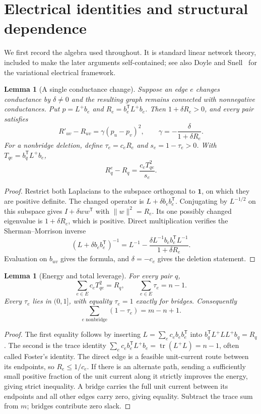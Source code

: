 \documentclass[11pt,letterpaper]{article}
\newtheorem{lemma}[theorem]{Lemma}
\newcommand{\one}{\mathbf 1}
\DeclareMathOperator{\tr}{tr}
\begin{document}
\section{Electrical identities and structural dependence}
We first record the algebra used throughout. It is standard linear network theory, included to make the later arguments self-contained; see also Doyle and Snell~\cite{DS} for the variational electrical framework.

\begin{lemma}[A single conductance change]\label{lem:update}
Suppose an edge $e$ changes conductance by $\delta\ne0$ and the resulting graph remains connected with nonnegative conductances. Put $p=L^+b_e$ and $R_e=b_e^{\mathsf T}L^+b_e$. Then $1+\delta R_e>0$, and every pair satisfies
\[
 R'_{uv}-R_{uv}=\gamma(p_u-p_v)^2,
 \qquad \gamma=-\frac{\delta}{1+\delta R_e}.
\]
For a nonbridge deletion, define $\tau_e=c_eR_e$ and $s_e=1-\tau_e>0$. With $T_{qe}=b_q^{\mathsf T}L^+b_e$,
\[
 R_q^e-R_q=\frac{c_eT_{qe}^2}{s_e}.
\]
\end{lemma}
\begin{proof}
Restrict both Laplacians to the subspace orthogonal to $\one$, on which they are positive definite. The changed operator is $L+\delta b_eb_e^{\mathsf T}$. Conjugating by $L^{-1/2}$ on this subspace gives $I+\delta ww^{\mathsf T}$ with $\|w\|^2=R_e$. Its one possibly changed eigenvalue is $1+\delta R_e$, which is positive. Direct multiplication verifies the Sherman--Morrison inverse
\[
 (L+\delta b_eb_e^{\mathsf T})^{-1}
 =L^{-1}-\frac{\delta L^{-1}b_eb_e^{\mathsf T}L^{-1}}{1+\delta R_e}.
\]
Evaluation on $b_{uv}$ gives the formula, and $\delta=-c_e$ gives the deletion statement.
\end{proof}

\begin{lemma}[Energy and total leverage]\label{lem:energy}
For every pair $q$,
\[
 \sum_{e\in E}c_eT_{qe}^2=R_q,
 \qquad \sum_{e\in E}\tau_e=n-1.
\]
Every $\tau_e$ lies in $(0,1]$, with equality $\tau_e=1$ exactly for bridges. Consequently
\[
 \sum_{e\text{ nonbridge}}(1-\tau_e)=m-n+1.
\]
\end{lemma}
\begin{proof}
The first equality follows by inserting $L=\sum_e c_eb_eb_e^{\mathsf T}$ into $b_q^{\mathsf T}L^+LL^+b_q=R_q$. The second is the trace identity $\sum_e c_eb_e^{\mathsf T}L^+b_e=\tr(L^+L)=n-1$, often called Foster's identity. The direct edge is a feasible unit-current route between its endpoints, so $R_e\le1/c_e$. If there is an alternate path, sending a sufficiently small positive fraction of the unit current along it strictly improves the energy, giving strict inequality. A bridge carries the full unit current between its endpoints and all other edges carry zero, giving equality. Subtract the trace sum from $m$; bridges contribute zero slack.
\end{proof}
\end{document}
